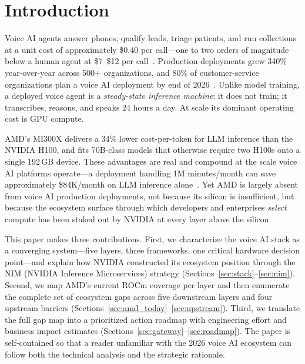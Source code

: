 \documentclass[blind]{gtac}
\begin{document}

\section{Introduction}
\label{sec:intro}

Voice AI agents answer phones, qualify leads, triage patients, and run collections at a unit cost of approximately \$0.40 per call---one to two orders of magnitude below a human agent at \$7--\$12 per call~\cite{assemblyai_2026,grandview}. Production deployments grew 340\% year-over-year across 500+ organizations, and 80\% of customer-service organizations plan a voice AI deployment by end of 2026~\cite{assemblyai_2026}. Unlike model training, a deployed voice agent is a \emph{steady-state inference machine}: it does not train; it transcribes, reasons, and speaks 24 hours a day. At scale its dominant operating cost is GPU compute.

AMD's MI300X delivers a 34\% lower cost-per-token for LLM inference than the NVIDIA H100, and fits 70B-class models that otherwise require two H100s onto a single 192\,GB device. These advantages are real and compound at the scale voice AI platforms operate---a deployment handling 1M minutes/month can save approximately \$84K/month on LLM inference alone~\cite{spheron_rocm,vllm_rocm}. Yet AMD is largely absent from voice AI production deployments, not because its silicon is insufficient, but because the ecosystem surface through which developers and enterprises \emph{select} compute has been staked out by NVIDIA at every layer above the silicon.

This paper makes three contributions. First, we characterize the voice AI stack as a converging system---five layers, three frameworks, one critical hardware decision point---and explain how NVIDIA constructed its ecosystem position through the NIM (NVIDIA Inference Microservices) strategy (Sections~\ref{sec:stack}--\ref{sec:nim}). Second, we map AMD's current ROCm coverage per layer and then enumerate the complete set of ecosystem gaps across five downstream layers and four upstream barriers (Sections~\ref{sec:amd_today}--\ref{sec:upstream}). Third, we translate the full gap map into a prioritized action roadmap with engineering effort and business impact estimates (Sections~\ref{sec:gateway}--\ref{sec:roadmap}). The paper is self-contained so that a reader unfamiliar with the 2026 voice AI ecosystem can follow both the technical analysis and the strategic rationale.
\end{document}

